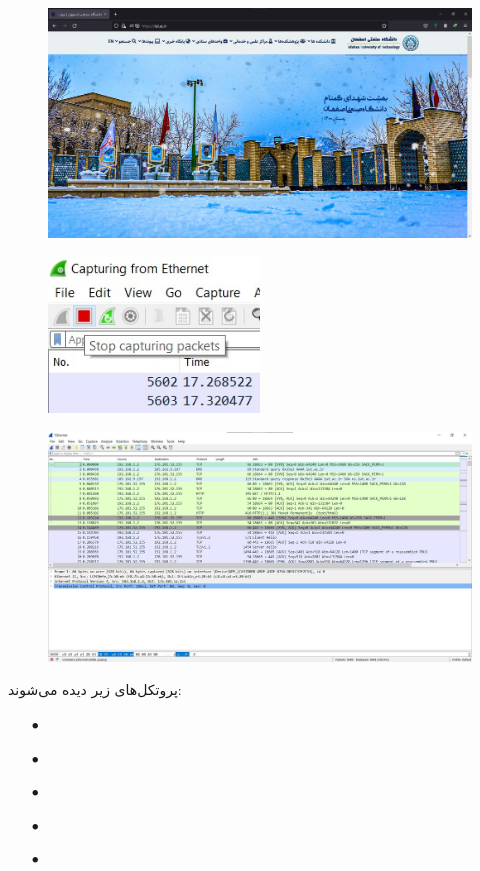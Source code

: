 \documentclass{article}
\begin{document}
\begin{figure}[H]
    \centering
    \includegraphics[width=1.0\textwidth]{figures/7.jpg}
    \caption{}
    \label{fig:fig1}
\end{figure}

\begin{figure}[H]
    \centering
    \includegraphics[width=0.5\textwidth]{figures/8.jpg}
    \caption{}
    \label{fig:fig1}
\end{figure}

\begin{figure}[H]
    \centering
    \includegraphics[width=1.0\textwidth]{figures/9.jpg}
    \caption{}
    \label{fig:fig1}
\end{figure}
پروتکل‌های زیر دیده می‌شوند:
\begin{itemize}
	\item [$\bullet$] 
	\item [$\bullet$] 
	\item [$\bullet$] 
	\item [$\bullet$] 
	\item [$\bullet$] 
\end{itemize}
\end{document}
